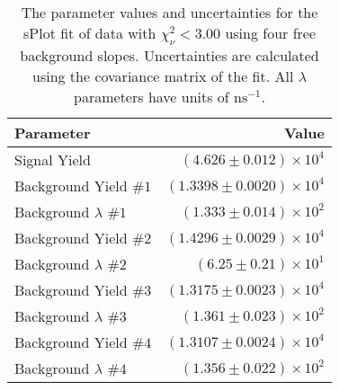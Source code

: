 
\begin{table}[ht]
    \begin{center}
        \begin{tabular}{lr}\toprule
            Parameter & Value \\\midrule
            Signal Yield & $(4.626 \pm 0.012) \times 10^{4}$ \\
            Background Yield $\#1$ & $(1.3398 \pm 0.0020) \times 10^{4}$ \\
            Background $\lambda$ $\#1$ & $(1.333 \pm 0.014) \times 10^{2}$ \\
            Background Yield $\#2$ & $(1.4296 \pm 0.0029) \times 10^{4}$ \\
            Background $\lambda$ $\#2$ & $(6.25 \pm 0.21) \times 10^{1}$ \\
            Background Yield $\#3$ & $(1.3175 \pm 0.0023) \times 10^{4}$ \\
            Background $\lambda$ $\#3$ & $(1.361 \pm 0.023) \times 10^{2}$ \\
            Background Yield $\#4$ & $(1.3107 \pm 0.0024) \times 10^{4}$ \\
            Background $\lambda$ $\#4$ & $(1.356 \pm 0.022) \times 10^{2}$ \\\bottomrule
        \end{tabular}
        \caption{The parameter values and uncertainties for the sPlot fit of data with $\chi^2_\nu < 3.00$ using four free background slopes. Uncertainties are calculated using the covariance matrix of the fit. All $\lambda$ parameters have units of $\si{\nano\second}^{-1}$.}\label{tab:splot-fit-results-chisqdof-3.00-free-4}
    \end{center}
\end{table}
